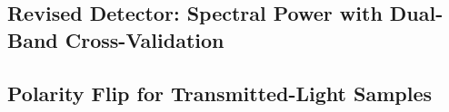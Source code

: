 \subsection{Revised Detector: Spectral Power with Dual-Band Cross-Validation}
\label{sec:detection:spectral}
%

\subsection{Polarity Flip for Transmitted-Light Samples}
\label{sec:detection:polarity}
%

